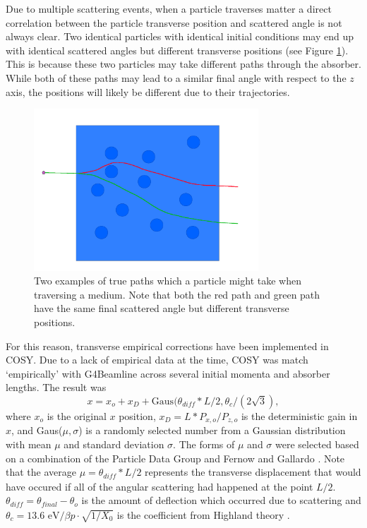 %
%
\label{sec:COSYTransverseDisplacement}\par
Due to multiple scattering events, when a particle traverses matter a direct correlation between the particle transverse position and scattered angle is not always clear. Two identical particles with identical initial conditions may end up with identical scattered angles but different transverse positions (see Figure \ref{fig:lateral_displacement}). This is because these two particles may take different paths through the absorber. While both of these paths may lead to a similar final angle with respect to the $z$ axis, the positions will likely be different due to their trajectories.

\begin{figure}
  \centering
    \includegraphics[width=0.75\textwidth]{Figures/lateral_displacement} 
  \caption[Two examples of true paths.]{Two examples of true paths which a particle might take when traversing a medium. Note that both the red path and green path have the same final scattered angle but different transverse positions.}
  \label{fig:lateral_displacement}
\end{figure}

For this reason, transverse empirical corrections have been implemented in  COSY. Due to a lack of empirical data at the time, COSY was match `empirically' with G4Beamline across several initial momenta and absorber lengths. The result was
\begin{equation}\label{eqn:cosylatdis}
x = x_o + x_D+\text{Gaus}(\theta_\textit{diff} *L/2,\theta_c /(2\sqrt{3}),
\end{equation}
where $x_o$ is the original $x$ position, $x_D = L*P_{x,o}/P_{z,o}$ is the deterministic  gain in $x$, and Gaus($\mu,\sigma$) is a randomly selected number from a Gaussian distribution with mean $\mu$ and standard deviation $\sigma$. The forms of $\mu$ and $\sigma$ were selected based on a combination of the Particle Data Group \cite{PDG} and Fernow and Gallardo  \cite{fernowAndGallardo}. Note that the average $\mu=\theta_\textit{diff}*L/2$ represents the transverse displacement that would have occured if all of the angular scattering had happened at the point $L/2$. $\theta_\textit{diff}=\theta_\textit{final}-\theta_o$ is the amount of deflection which occurred due to scattering and $\theta_c=13.6 \text{ eV}/\beta p \cdot \sqrt{1/X_0}$ is the coefficient from Highland theory \cite{highland}.

